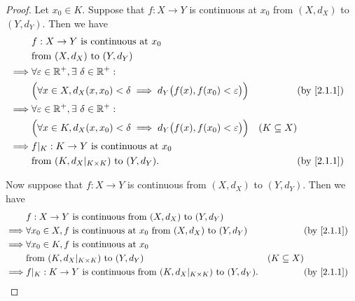 \begin{proof}
  Let \(x_0 \in K\).
  Suppose that \(f : X \to Y\) is continuous at \(x_0\) from \((X, d_X)\) to \((Y, d_Y)\).
  Then we have
  \begin{align*}
             & f : X \to Y \text{ is continuous at } x_0                                                                                       \\
             & \text{from } (X, d_X) \text{ to } (Y, d_Y)                                                                                      \\
    \implies & \forall \varepsilon \in \R^+, \exists\ \delta \in \R^+ :                                                                        \\
             & \Big(\forall x \in X, d_X(x, x_0) < \delta \implies d_Y\big(f(x), f(x_0) < \varepsilon\big)\Big) &                 & \by{2.1.1} \\
    \implies & \forall \varepsilon \in \R^+, \exists\ \delta \in \R^+ :                                                                        \\
             & \Big(\forall x \in K, d_X(x, x_0) < \delta \implies d_Y\big(f(x), f(x_0) < \varepsilon\big)\Big) & (K \subseteq X)              \\
    \implies & f|_K : K \to Y \text{ is continuous at } x_0                                                                                    \\
             & \text{from } (K, d_X|_{K \times K}) \text{ to } (Y, d_Y).                                        &                 & \by{2.1.1}
  \end{align*}

  Now suppose that \(f : X \to Y\) is continuous from \((X, d_X)\) to \((Y, d_Y)\).
  Then we have
  \begin{align*}
             & f : X \to Y \text{ is continuous from } (X, d_X) \text{ to } (Y, d_Y)                                                         \\
    \implies & \forall x_0 \in X, f \text{ is continuous at } x_0 \text{ from } (X, d_X) \text{ to } (Y, d_Y) &                 & \by{2.1.1} \\
    \implies & \forall x_0 \in K, f \text{ is continuous at } x_0                                                                            \\
             & \text{from } (K, d_X|_{K \times K}) \text{ to } (Y, d_Y)                                       & (K \subseteq X)              \\
    \implies & f|_K : K \to Y \text{ is continuous from } (K, d_X|_{K \times K}) \text{ to } (Y, d_Y).        &                 & \by{2.1.1}
  \end{align*}
\end{proof}

